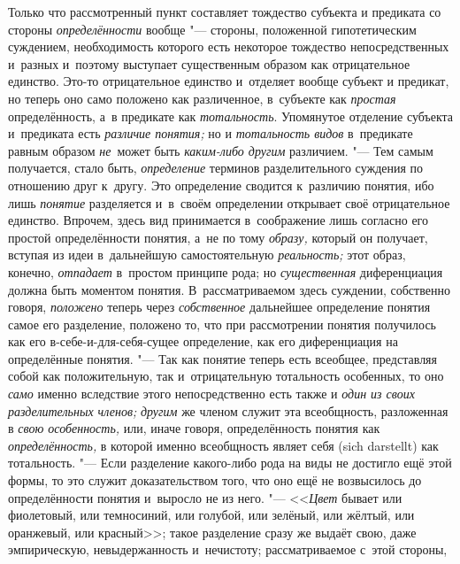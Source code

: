 Только что рассмотренный пункт составляет тождество субъекта и
предиката со стороны {\em определённости}
вообще "--- стороны, положенной гипотетическим
суждением, необходимость которого есть некоторое тождество непосредственных
и~разных и~поэтому выступает существенным образом как отрицательное
единство. Это-то отрицательное единство и~отделяет вообще субъект и
предикат, но теперь оно само положено как различенное, в~субъекте как
{\em простая} определённость, а~в предикате как {\em тотальность}.
Упомянутое отделение субъекта и~предиката есть {\em различие понятия;}
но и {\em тотальность видов} в~предикате равным образом {\em не}~может быть
{\em каким-либо другим} различием. "--- Тем самым получается, стало быть,
{\em определение} терминов разделительного суждения по отношению друг к~другу.
Это определение сводится к~различию понятия, ибо лишь {\em понятие} разделяется
и~в~своём определении открывает своё отрицательное единство. Впрочем, здесь
вид принимается в~соображение лишь согласно его простой определённости
понятия, а~не по тому {\em образу,} который он получает, вступая из идеи
в~дальнейшую самостоятельную {\em реальность;} этот образ, конечно,
{\em отпадает} в~простом принципе рода; но {\em существенная}
диференциация должна быть моментом понятия. В~рассматриваемом здесь
суждении, собственно говоря, {\em положено} теперь через {\em собственное}
дальнейшее определение понятия самое его разделение, положено
то, что при рассмотрении понятия получилось как его в-себе-и-для-себя-сущее
определение, как его диференциация на определённые понятия. "---
Так как понятие теперь есть всеобщее, представляя собой как
положительную, так и~отрицательную тотальность особенных, то оно
{\em само} именно вследствие этого непосредственно есть также и
{\em один из своих разделительных членов;} {\em другим} же
членом служит эта всеобщность, разложенная в {\em свою особенность,}
или, иначе говоря, определённость понятия как {\em определённость,} в
которой именно всеобщность являет себя (sich darstellt) как
тотальность. "--- Если разделение какого-либо рода на виды не
достигло ещё этой формы, то это служит доказательством того, что оно ещё не
возвысилось до определённости понятия и~выросло не из него. "---
<<{\em Цвет} бывает или фиолетовый, или темносиний, или голубой, или
зелёный, или жёлтый, или оранжевый, или красный>>;
такое разделение сразу же выдаёт свою, даже
эмпирическую, невыдержанность и~нечистоту; рассматриваемое с~этой стороны,
